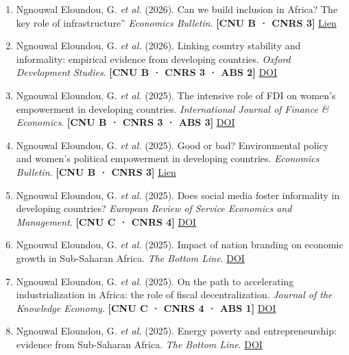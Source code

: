 \documentclass[
  french,
  10pt,
  letterpaper,
  DIV=11,
  numbers=noendperiod]{scrartcl}
\newcommand{\rank}[1]{{\small\color{accent}\textbf{[#1]}}}
\begin{document}
\begin{enumerate}[leftmargin=1.6em, itemsep=3pt]

\item Ngnouwal Eloundou, G. \textit{et al.} (2026). Can we build inclusion in Africa? The key role of infrastructure'' \textit{Economics Bulletin}. \rank{CNU B · CNRS 3} \href{http://www.accessecon.com/Pubs/EB/2026/Volume46/EB-26-V46-I1-P1.pdf}{Lien}

\item Ngnouwal Eloundou, G. \textit{et al.} (2026). Linking country stability and informality: empirical evidence from developing countries. \textit{Oxford Development Studies}. \rank{CNU B · CNRS 3 · ABS 2} \href{https://doi.org/10.1080/13600818.2026.2654469}{DOI}

\item Ngnouwal Eloundou, G. \textit{et al.} (2025). The intensive role of FDI on women's empowerment in developing countries. \textit{International Journal of Finance \& Economics}. \rank{CNU B · CNRS 3 · ABS 3} \href{https://doi.org/10.1002/ijfe.70097}{DOI}

\item Ngnouwal Eloundou, G. \textit{et al.} (2025). Good or bad? Environmental policy and women's political empowerment in developing countries. \textit{Economics Bulletin}. \rank{CNU B · CNRS 3} \href{https://econpapers.repec.org/article/eblecbull/eb-23-00209.htm}{Lien}

\item Ngnouwal Eloundou, G. \textit{et al.} (2025). Does social media foster informality in developing countries? \textit{European Review of Service Economics and Management}. \rank{CNU C · CNRS 4} \href{https://doi.org/10.48611/isbn.978-2-406-18573-4.p.0071}{DOI}

\item Ngnouwal Eloundou, G. \textit{et al.} (2025). Impact of nation branding on economic growth in Sub-Saharan Africa. \textit{The Bottom Line}. \href{https://doi.org/10.1108/BL-07-2024-0088}{DOI}

\item Ngnouwal Eloundou, G. \textit{et al.} (2025). On the path to accelerating industrialization in Africa: the role of fiscal decentralization. \textit{Journal of the Knowledge Economy}. \rank{CNU C · CNRS 4 · ABS 1} \href{https://doi.org/10.1007/s13132-025-02602-2}{DOI}

\item Ngnouwal Eloundou, G. \textit{et al.} (2025). Energy poverty and entrepreneurship: evidence from Sub-Saharan Africa. \textit{The Bottom Line}. \href{https://doi.org/10.1108/BL-09-2024-0169}{DOI}


\end{enumerate}
\end{document}
